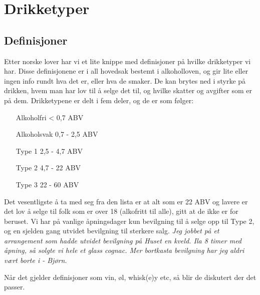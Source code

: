 \chapter{Drikketyper}
\section{Definisjoner}
Etter norske lover har vi et lite knippe med definisjoner på hvilke drikketyper vi har. Disse definisjonene er i all hovedsak bestemt i alkoholloven, og gir lite eller ingen info rundt hva det er, eller hva de smaker. De kan brytes ned i styrke på drikken, hvem man har lov til å selge det til, og hvilke skatter og avgifter som er på dem. Drikketypene er delt i fem deler, og de er som følger:
\begin{itemize}
    \item[Alkoholfri]  < 0,7 ABV
    \item[Alkoholsvak] 0,7 - 2,5 ABV 
    \item[Type 1] 2,5 - 4,7 ABV 
    \item[Type 2] 4,7 - 22 ABV
    \item[Type 3] 22 - 60 ABV
\end{itemize}

Det vesentligste å ta med seg fra den lista er at alt som er 22 ABV og lavere er det lov å selge til folk som er over 18 (alkofritt til alle), gitt at de ikke er for beruset. Vi har på vanlige åpningsdager kun bevilgning til å selge opp til Type 2, og en sjelden gang utvidet bevilgning til sterkere salg. \textit{Jeg jobbet på et arrangement som hadde utvidet bevilgning på Huset en kveld. Ila 8 timer med åpning, så solgte vi hele et glass cognac. Mer bortkasta bevilgning har jeg aldri vært borte i - Bjørn.}

Når det gjelder definisjoner som vin, øl, whisk(e)y etc, så blir de diskutert der det passer.